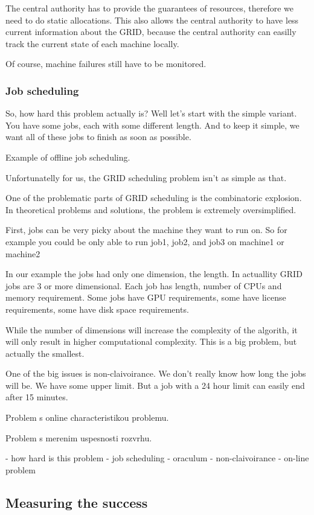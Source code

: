 \documentclass[12pt,a4paper]{article}
\begin{document}
The central authority has to provide the guarantees of resources, therefore we
need to do static allocations. This also allows the central authority to have
less current information about the GRID, because the central authority can
easilly track the current state of each machine locally.

Of course, machine failures still have to be monitored.

\subsubsection{Job scheduling}

So, how hard this problem actually is? Well let's start with the simple variant.
You have some jobs, each with some different length.  And to keep it simple, we
want all of these jobs to finish as soon as possible.  

Example of offline job scheduling.

Unfortunatelly for us, the GRID scheduling problem isn't as simple as that.

One of the problematic parts of GRID scheduling is the combinatoric explosion.
In theoretical problems and solutions, the problem is extremely oversimplified.

First, jobs can be very picky about the machine they want to run on.
So for example you could be only able to run job1, job2, and job3 on machine1 or machine2

In our example the jobs had only one dimension, the length.  In actuallity GRID
jobs are 3 or more dimensional. Each job has length, number of CPUs and memory
requirement. Some jobs have GPU requirements, some have license requirements,
some have disk space requirements.

While the number of dimensions will increase the complexity of the algorith, it
will only result in higher computational complexity. This is a big problem, but
actually the smallest.

One of the big issues is non-claivoirance. We don't really know how long the
jobs will be.  We have some upper limit. But a job with a 24 hour limit can
easily end after 15 minutes.

Problem s online characteristikou problemu.

Problem s merenim uspesnosti rozvrhu.

- how hard is this problem
  - job scheduling
  - oraculum
  - non-claivoirance
  - on-line problem

\subsection{Measuring the success}
\end{document}
